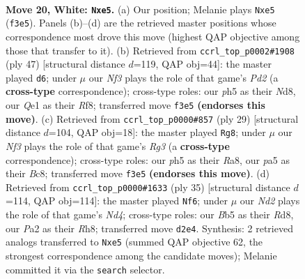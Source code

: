 \documentclass[11pt]{article}
\begin{document}
\clearpage

\begin{figure}[p]\centering
\begin{subfigure}{0.46\textwidth}\centering
\resizebox{\linewidth}{!}{%
\newchessgame
\chessboard[
  setfen={2b2rk1/2p2p2/5rp1/pB2p2p/2P3nP/3q1N2/PP1N2P1/R1B1Q2K w - - 3 20},
  showmover=false,
  pgfstyle=straightmove, color=movearrow, markmove={f3-e5}
]}
\caption{}
\end{subfigure}\hfill
\begin{subfigure}{0.46\textwidth}\centering
\resizebox{\linewidth}{!}{%
\newchessgame
\chessboard[
  setfen={3nkr2/3pb1pp/p1q2n2/1pp2Q2/4P3/2PPBP2/PP4PP/4RRK1 b - - 2 24},
  showmover=false,
  pgfstyle=straightmove, color=movearrow, markmove={d7-d6}
]}
\caption{}
\end{subfigure}
\\[4pt]
\begin{subfigure}{0.46\textwidth}\centering
\resizebox{\linewidth}{!}{%
\newchessgame
\chessboard[
  setfen={r1bqk2Q/1pp2p2/3p1nr1/p7/4n3/P2B1N2/1P3PPP/R1B1K2R b KQq - 2 15},
  showmover=false,
  pgfstyle=straightmove, color=movearrow, markmove={g6-g8}
]}
\caption{}
\end{subfigure}\hfill
\begin{subfigure}{0.46\textwidth}\centering
\resizebox{\linewidth}{!}{%
\newchessgame
\chessboard[
  setfen={3rkb1r/1pq1p2p/p1n1Q1p1/3n4/5P2/1NN5/PP1B2PP/R4RK1 b k - 0 18},
  showmover=false,
  pgfstyle=straightmove, color=movearrow, markmove={d5-f6}
]}
\caption{}
\end{subfigure}
\caption{\textbf{Move 20, White: \texttt{Nxe5}.} (a) Our position; Melanie plays \texttt{Nxe5} (\texttt{f3e5}). Panels (b)--(d) are the retrieved master positions whose correspondence most drove this move (highest QAP objective among those that transfer to it). (b) Retrieved from \texttt{ccrl\_top\_p0002\#1908} (ply 47) [structural distance $d$=119, QAP obj=44]: the master played \texttt{d6}; under $\mu$ our \emph{Nf3} plays the role of that game's \emph{Pd2} (a \textbf{cross-type} correspondence); cross-type roles: our \emph{p}h5 as their \emph{N}d8, our \emph{Q}e1 as their \emph{R}f8; transferred move \texttt{f3e5} \textbf{(endorses this move)}. (c) Retrieved from \texttt{ccrl\_top\_p0000\#857} (ply 29) [structural distance $d$=104, QAP obj=18]: the master played \texttt{Rg8}; under $\mu$ our \emph{Nf3} plays the role of that game's \emph{Rg3} (a \textbf{cross-type} correspondence); cross-type roles: our \emph{p}h5 as their \emph{R}a8, our \emph{p}a5 as their \emph{B}c8; transferred move \texttt{f3e5} \textbf{(endorses this move)}. (d) Retrieved from \texttt{ccrl\_top\_p0000\#1633} (ply 35) [structural distance $d$=114, QAP obj=114]: the master played \texttt{Nf6}; under $\mu$ our \emph{Nd2} plays the role of that game's \emph{Nd4}; cross-type roles: our \emph{B}b5 as their \emph{R}d8, our \emph{P}a2 as their \emph{R}h8; transferred move \texttt{d2e4}. Synthesis: 2 retrieved analogs transferred to \texttt{Nxe5} (summed QAP objective 62, the strongest correspondence among the candidate moves); Melanie committed it via the \texttt{search} selector.}
\label{fig:thought-m38}
\end{figure}
\end{document}
